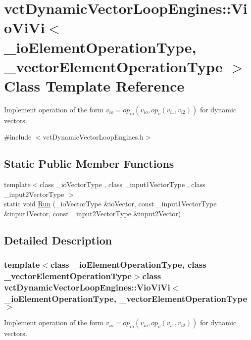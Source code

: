 \hypertarget{classvct_dynamic_vector_loop_engines_1_1_vio_vi_vi}{}\section{vct\+Dynamic\+Vector\+Loop\+Engines\+:\+:Vio\+Vi\+Vi$<$ \+\_\+io\+Element\+Operation\+Type, \+\_\+vector\+Element\+Operation\+Type $>$ Class Template Reference}
\label{classvct_dynamic_vector_loop_engines_1_1_vio_vi_vi}


Implement operation of the form $v_{io} = op_{io}(v_{io}, op_{v}(v_{i1}, v_{i2}))$ for dynamic vectors.  




{\ttfamily \#include $<$vct\+Dynamic\+Vector\+Loop\+Engines.\+h$>$}

\subsection*{Static Public Member Functions}
\begin{DoxyCompactItemize}
\item 
{\footnotesize template$<$class \+\_\+io\+Vector\+Type , class \+\_\+input1\+Vector\+Type , class \+\_\+input2\+Vector\+Type $>$ }\\static void \hyperlink{classvct_dynamic_vector_loop_engines_1_1_vio_vi_vi_a0bbdb2a24aa1cf001c0c9aa2e25d3ca3}{Run} (\+\_\+io\+Vector\+Type \&io\+Vector, const \+\_\+input1\+Vector\+Type \&input1\+Vector, const \+\_\+input2\+Vector\+Type \&input2\+Vector)
\end{DoxyCompactItemize}


\subsection{Detailed Description}
\subsubsection*{template$<$class \+\_\+io\+Element\+Operation\+Type, class \+\_\+vector\+Element\+Operation\+Type$>$class vct\+Dynamic\+Vector\+Loop\+Engines\+::\+Vio\+Vi\+Vi$<$ \+\_\+io\+Element\+Operation\+Type, \+\_\+vector\+Element\+Operation\+Type $>$}

Implement operation of the form $v_{io} = op_{io}(v_{io}, op_{v}(v_{i1}, v_{i2}))$ for dynamic vectors. 

